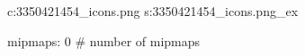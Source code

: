 c:3350421454\textures\hexer_icons.png
s:3350421454\textures\hexer_icons.png_ex

mipmaps: 0  # number of mipmaps
